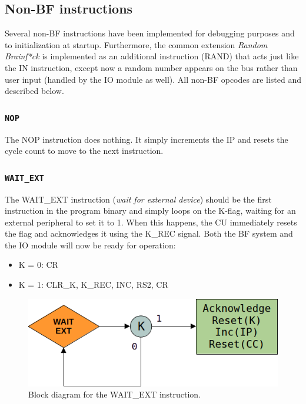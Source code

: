 \subsection{Non-BF instructions} \label{seq:sequences:nonbf}
Several non-BF instructions have been implemented for debugging purposes and to initialization at startup. Furthermore, the common extension \emph{Random Brainf*ck} \cite{esolangs-rbf} is implemented as an additional instruction (RAND) that acts just like the IN instruction, except now a random number appears on the bus rather than user input (handled by the IO module as well). All non-BF opcodes are listed and described below.

\subsubsection{\texttt{NOP}}
The NOP instruction does nothing. It simply increments the IP and resets the cycle count to move to the next instruction.

\subsubsection{\texttt{WAIT\_EXT}}
The WAIT\_EXT instruction (\emph{wait for external device}) should be the first instruction in the program binary and simply loops on the K-flag, waiting for an external peripheral to set it to 1. When this happens, the CU immediately resets the flag and acknowledges it using the K\_REC signal. Both the BF system and the IO module will now be ready for operation:
\begin{itemize}
 \item K = 0: CR
 \item K = 1: CLR\_K, K\_REC, INC, RS2, CR
\end{itemize}

\begin{figure}[H]
  \centering
  \includegraphics[scale=0.4]{img/waitextalg}
  \caption{Block diagram for the WAIT\_EXT instruction.}
  \label{fig:rightalg}
\end{figure}


